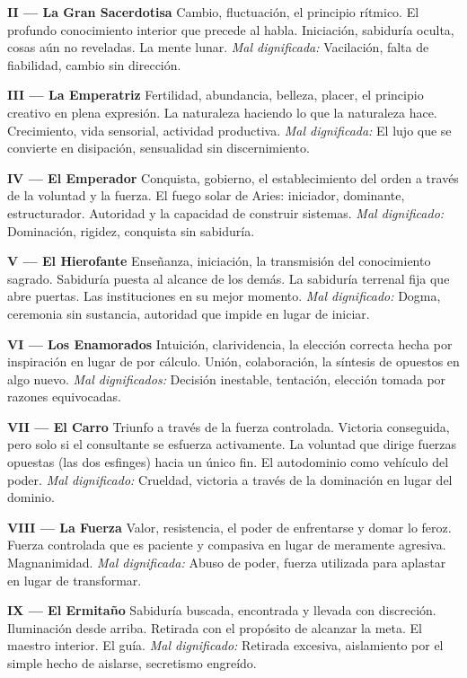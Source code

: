 \textbf{II --- La Gran Sacerdotisa} Cambio, fluctuación, el principio rítmico. El profundo conocimiento interior que precede al habla. Iniciación, sabiduría oculta, cosas aún no reveladas. La mente lunar. \emph{Mal dignificada:} Vacilación, falta de fiabilidad, cambio sin dirección.

\textbf{III --- La Emperatriz} Fertilidad, abundancia, belleza, placer, el principio creativo en plena expresión. La naturaleza haciendo lo que la naturaleza hace. Crecimiento, vida sensorial, actividad productiva. \emph{Mal dignificada:} El lujo que se convierte en disipación, sensualidad sin discernimiento.

\textbf{IV --- El Emperador} Conquista, gobierno, el establecimiento del orden a través de la voluntad y la fuerza. El fuego solar de Aries: iniciador, dominante, estructurador. Autoridad y la capacidad de construir sistemas. \emph{Mal dignificado:} Dominación, rigidez, conquista sin sabiduría.

\textbf{V --- El Hierofante} Enseñanza, iniciación, la transmisión del conocimiento sagrado. Sabiduría puesta al alcance de los demás. La sabiduría terrenal fija que abre puertas. Las instituciones en su mejor momento. \emph{Mal dignificado:} Dogma, ceremonia sin sustancia, autoridad que impide en lugar de iniciar.

\textbf{VI --- Los Enamorados} Intuición, clarividencia, la elección correcta hecha por inspiración en lugar de por cálculo. Unión, colaboración, la síntesis de opuestos en algo nuevo. \emph{Mal dignificados:} Decisión inestable, tentación, elección tomada por razones equivocadas.

\textbf{VII --- El Carro} Triunfo a través de la fuerza controlada. Victoria conseguida, pero solo si el consultante se esfuerza activamente. La voluntad que dirige fuerzas opuestas (las dos esfinges) hacia un único fin. El autodominio como vehículo del poder. \emph{Mal dignificado:} Crueldad, victoria a través de la dominación en lugar del dominio.

\textbf{VIII --- La Fuerza} Valor, resistencia, el poder de enfrentarse y domar lo feroz. Fuerza controlada que es paciente y compasiva en lugar de meramente agresiva. Magnanimidad. \emph{Mal dignificada:} Abuso de poder, fuerza utilizada para aplastar en lugar de transformar.

\textbf{IX --- El Ermitaño} Sabiduría buscada, encontrada y llevada con discreción. Iluminación desde arriba. Retirada con el propósito de alcanzar la meta. El maestro interior. El guía. \emph{Mal dignificado:} Retirada excesiva, aislamiento por el simple hecho de aislarse, secretismo engreído.


